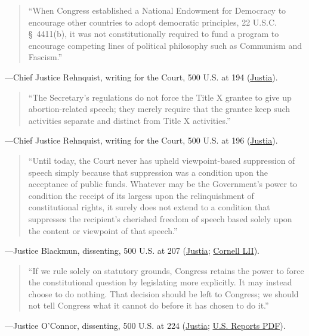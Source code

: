 \documentclass[12pt]{article}
\begin{document}
\begin{quote}
``When Congress established a National Endowment for Democracy to encourage other countries to adopt democratic principles, 22 U.S.C. \S~4411(b), it was not constitutionally required to fund a program to encourage competing lines of political philosophy such as Communism and Fascism.''
\end{quote}
\noindent---Chief Justice Rehnquist, writing for the Court, 500 U.S. at 194 (\href{https://supreme.justia.com/cases/federal/us/500/173/}{Justia}).

\begin{quote}
``The Secretary's regulations do not force the Title X grantee to give up abortion-related speech; they merely require that the grantee keep such activities separate and distinct from Title X activities.''
\end{quote}
\noindent---Chief Justice Rehnquist, writing for the Court, 500 U.S. at 196 (\href{https://supreme.justia.com/cases/federal/us/500/173/}{Justia}).

\begin{quote}
``Until today, the Court never has upheld viewpoint-based suppression of speech simply because that suppression was a condition upon the acceptance of public funds. Whatever may be the Government's power to condition the receipt of its largess upon the relinquishment of constitutional rights, it surely does not extend to a condition that suppresses the recipient's cherished freedom of speech based solely upon the content or viewpoint of that speech.''
\end{quote}
\noindent---Justice Blackmun, dissenting, 500 U.S. at 207 (\href{https://supreme.justia.com/cases/federal/us/500/173/}{Justia}; \href{https://www.law.cornell.edu/supct/html/89-1391.ZD1.html}{Cornell LII}).

\begin{quote}
``If we rule solely on statutory grounds, Congress retains the power to force the constitutional question by legislating more explicitly. It may instead choose to do nothing. That decision should be left to Congress; we should not tell Congress what it cannot do before it has chosen to do it.''
\end{quote}
\noindent---Justice O'Connor, dissenting, 500 U.S. at 224 (\href{https://supreme.justia.com/cases/federal/us/500/173/}{Justia}; \href{https://tile.loc.gov/storage-services/service/ll/usrep/usrep500/usrep500173/usrep500173.pdf}{U.S. Reports PDF}).
\end{document}
